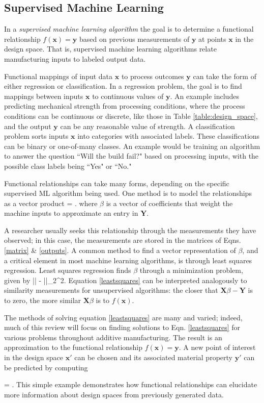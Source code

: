 \subsection{Supervised Machine Learning}
In a \textit{supervised machine learning algorithm} the goal is to determine a functional relationship $f(\mathbf{x}) = \mathbf{y}$ based on previous measurements of $\mathbf{y}$ at points $\mathbf{x}$ in the design space. That is, supervised machine learning algorithms relate manufacturing inputs to labeled output data. 

Functional mappings of input data $\mathbf{x}$ to process outcomes $\mathbf{y}$ can take the form of either regression or classification. In a regression problem, the goal is to find mappings between inputs $\mathbf{x}$ to continuous values of $\mathbf{y}$. An example includes predicting mechanical strength from processing conditions, where the process conditions can be continuous or discrete, like those in Table \ref{table:design_space}, and the output $\mathbf{y}$ can be any reasonable value of strength. A classification problem sorts inputs $\mathbf{x}$ into categories with associated labels. These classifications can be binary or one-of-many classes. An example would be training an algorithm to answer the question ``Will the build fail?" based on processing inputs, with the possible class labels being ``Yes" or ``No."


Functional relationships can take many forms, depending on the specific supervised ML algorithm being used. One method is to model the relationships as a vector product
\eqn
{}\beta = .
\label{map}
\equ
where $\beta$ is a vector of coefficients that weight the machine inputs to approximate an entry in $\mathbf{Y}$. 

A researcher usually seeks this relationship through the measurements they have observed; in this case, the measurements are stored in the matrices of Eqns. \ref{matrix} \& \ref{outputs}.
A common method to find a vector representation of $\beta$, and a critical element in most machine learning algorithms, is through least squares regression. Least squares regression finds $\beta$ through a minimization problem, given by
\eqn
\min || \beta -  ||_{2}^{2}.
\label{leastsquares}
\equ
Equation \ref{leastsquares} can be interpreted analogously to similarity measurements for unsupervised algorithms: the closer that $\mathbf{X}\beta - \mathbf{Y}$ is to zero, the more similar $\mathbf{X}\beta$ is to $f(\mathbf{x})$.

The methods of solving equation \ref{leastsquares} are many and varied; indeed, much of this review will focus on finding solutions to Eqn. \ref{leastsquares} for various problems throughout additive manufacturing.
The result is an approximation to the functional relationship $f(\mathbf{x}) = \mathbf{y}$.
A new point of interest in the design space $\mathbf{x'}$ can be chosen and its associated material property $\mathbf{y'}$ can be predicted by computing

\eqn
{}\beta = .
\equ
This simple example demonstrates how functional relationships can elucidate more information about design spaces from previously generated data.


